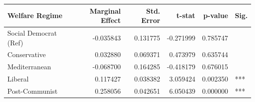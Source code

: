 \begin{tabular}{lrrrrl}
\toprule
Welfare Regime & Marginal Effect & Std. Error & t-stat & p-value & Sig. \\
\midrule
Social Democrat (Ref) & -0.035843 & 0.131775 & -0.271999 & 0.785747 &  \\
Conservative & 0.032880 & 0.069371 & 0.473979 & 0.635744 &  \\
Mediterranean & -0.068700 & 0.164285 & -0.418179 & 0.676015 &  \\
Liberal & 0.117427 & 0.038382 & 3.059424 & 0.002350 & *** \\
Post-Communist & 0.258056 & 0.042651 & 6.050439 & 0.000000 & *** \\
\bottomrule
\end{tabular}
